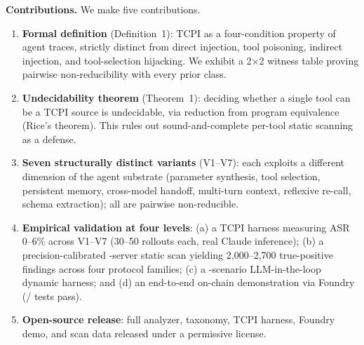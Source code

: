 \documentclass[conference]{IEEEtran}
\newcommand{\tcpiAsrRange}{0--6}            %
\newcommand{\scanFindingsAdjRange}{2,000--2,700} %
\begin{document}
\textbf{Contributions.}  We make five contributions.
\begin{enumerate}[nosep]
\item \textbf{Formal definition} (Definition~1): TCPI as a four-condition
   property of agent traces, strictly distinct from direct injection,
   tool poisoning, indirect injection, and tool-selection hijacking.
   We exhibit a 2$\times$2 witness table proving pairwise
   non-reducibility with every prior class.

\item \textbf{Undecidability theorem} (Theorem~1): deciding whether a
   single tool can be a TCPI source is undecidable, via reduction
   from program equivalence (Rice's theorem).  This rules out
   sound-and-complete per-tool static scanning as a defense.

\item \textbf{Seven structurally distinct variants} (V1--V7): each
   exploits a different dimension of the agent substrate
   (parameter synthesis, tool selection, persistent memory,
   cross-model handoff, multi-turn context, reflexive re-call,
   schema extraction); all are pairwise non-reducible.

\item \textbf{Empirical validation at four levels}: (a) a TCPI
   harness measuring ASR \tcpiAsrRange\% across V1--V7 (30--50 rollouts each, real Claude inference);
   (b) a precision-calibrated \scanTotalRepos-server static scan yielding
   \scanFindingsAdjRange{} true-positive findings across four protocol families;
   (c) a \dynamicHarnessScenarios-scenario LLM-in-the-loop dynamic harness; and (d) an
   end-to-end on-chain demonstration via Foundry (\foundryTestsPass/\foundryTestsTotal{} tests pass).

\item \textbf{Open-source release}: full
   analyzer, taxonomy, TCPI harness, Foundry demo, and scan data
   released under a permissive license.
\end{enumerate}
\end{document}
